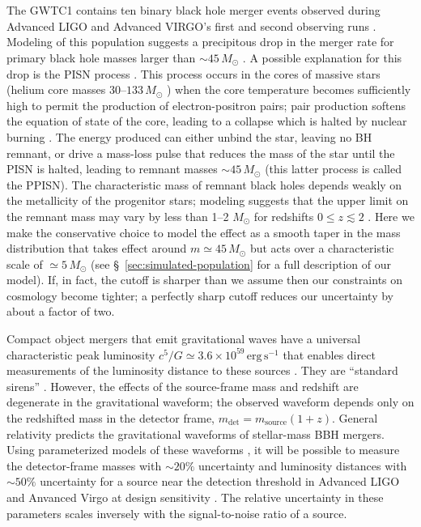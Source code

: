 \documentclass[modern]{aastex62}
\newcommand{\MPISN}{45 \, \MSun{}}
\newcommand{\MTaperScale}{5 \, \MSun{}}
\newcommand{\MSun}{M_\odot}
\begin{document}
\section*{ }

The \ac{GWTC1} contains ten binary black hole merger events observed during
Advanced LIGO and Advanced VIRGO's first and second observing runs
\citep{GWTC-1}. Modeling of this population suggests a precipitous drop in the
merger rate for primary black hole masses larger than $\sim \MPISN{}$
\citep{Fishbach2017,GWTC-1}.  A possible explanation for this drop is the
\ac{PISN} process
\citep{Fowler1964,Rakavy1967,Bond1984,Heger2002,Belczynski2016,Woosley2017,Spera2017}.
This process occurs in the cores of massive stars (helium core masses $30$--$133
\, \MSun$ \citep{Woosley2017}) when the core temperature becomes sufficiently
high to permit the production of electron-positron pairs; pair production
softens the equation of state of the core, leading to a collapse which is halted
by nuclear burning \citep{Heger2002}.  The energy produced can either unbind the
star, leaving no \ac{BH} remnant, or drive a mass-loss pulse that reduces the
mass of the star until the \ac{PISN} is halted, leading to remnant masses $\sim
\MPISN{}$ (this latter process is called the \ac{PPISN}). The characteristic
mass of remnant black holes depends weakly on the metallicity of the progenitor
stars; modeling suggests that the upper limit on the remnant mass may vary by
less than 1--2 $\MSun$ for redshifts $0 \leq z \lesssim 2$
\citep{Belczynski2016,Mapelli2017}.  Here we make the conservative choice to
model the effect as a smooth taper in the mass distribution that takes effect
around $m \simeq \MPISN{}$ but acts over a characteristic scale of $\simeq
\MTaperScale$ (see \S\ \ref{sec:simulated-population} for a full description of
our model).  If, in fact, the cutoff is sharper than we assume then our
constraints on cosmology become tighter; a perfectly sharp cutoff reduces our
uncertainty by about a factor of two.

Compact object mergers that emit gravitational waves have a universal
characteristic peak luminosity $c^5/G \simeq 3.6 \times 10^{59} \, \mathrm{erg}
\, \mathrm{s}^{-1}$ that enables direct measurements of the luminosity distance
to these sources \citep{Schutz1986}.  They are ``standard sirens''
\citep{Holz2005}. However, the effects of the source-frame mass and redshift are
degenerate in the gravitational waveform; the observed waveform depends only on
the redshifted mass in the detector frame, $m_\mathrm{det} = m_\mathrm{source}
(1 + z)$. General relativity predicts the gravitational waveforms of
stellar-mass \ac{BBH} mergers.  Using parameterized models of these waveforms
\citep{Taracchini2014,Kahn2016,Bohe2017,Chatziioannou2017}, it will be possible
to measure the detector-frame masses with $\sim 20\%$ uncertainty and luminosity
distances \citep{Hogg1999} with $\sim 50\%$ uncertainty for a source near the
detection threshold in Advanced LIGO and Anvanced Virgo at design sensitivity
\citep{Vitale2017}.  The relative uncertainty in these parameters scales
inversely with the signal-to-noise ratio of a source.
\end{document}
